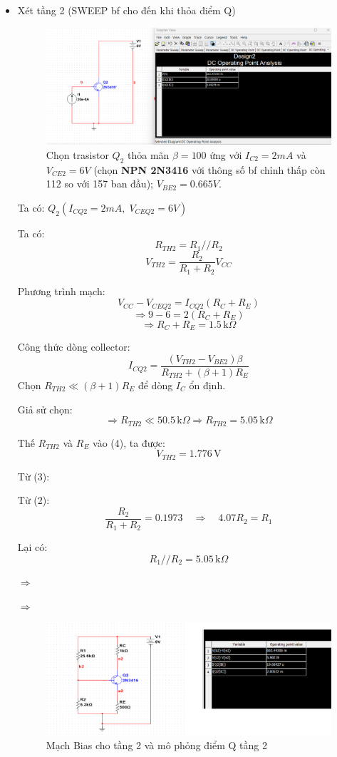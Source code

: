 \begin{itemize}[label=-]
\item Xét tầng 2 (SWEEP bf cho đến khi thỏa điểm Q)

\begin{figure}[H]
	\centering
	\includegraphics[width=.8\linewidth]{./my-chapters/my-images/Question10/a_tang3.png}
	\caption{Chọn trasistor $Q_{2}$ thỏa mãn $\beta = 100$ ứng với $I_{C2} = 2 mA$ và $V_{CE2} = 6V$ (chọn \textbf{NPN 2N3416} với thông số bf chỉnh thấp còn 112 so với 157 ban đầu); $V_{BE2} =0.665V$.}
\end{figure}

\noindent Ta có: $Q_2( I_{CQ2} = 2{mA},\; V_{CEQ2} = 6{V})$

Ta có:
\[
R_{TH2} = R_1 // R_2 \tag{1}
\]
\[
V_{TH2} = \frac{R_2}{R_1 + R_2} V_{CC} \tag{2}
\]

Phương trình mạch:
\[
V_{CC} - V_{CEQ2} = I_{CQ2}(R_C + R_E)
\]
\[
\Rightarrow 9 - 6 = 2(R_C + R_E)
\]
\[
\Rightarrow R_C + R_E = 1.5\,\text{k}\Omega \tag{3}
\]

Công thức dòng collector:
\[
I_{CQ2} = \frac{(V_{TH2} - V_{BE2})\beta}{R_{TH2} + (\beta + 1)R_E} \tag{4}
\]
Chọn \( R_{TH2} \ll (\beta + 1)R_E \) để dòng \( I_C \) ổn định.  

Giả sử chọn: 
\[
\Rightarrow R_{TH2} \ll 50.5\,\text{k}\Omega \Rightarrow R_{TH2} = 5.05\,\text{k}\Omega
\]

Thế \( R_{TH2} \) và \( R_E \) vào (4), ta được:
\[
V_{TH2} = 1.776\,\text{V}
\]

Từ (3):


Từ (2):
\[
\frac{R_2}{R_1 + R_2} = 0.1973 \quad \Rightarrow \quad 4.07R_2 = R_1
\]

Lại có:
\[
R_1 // R_2 = 5.05\,\text{k}\Omega
\]

$\Rightarrow$  

$\Rightarrow$ 

\begin{figure}[H]
	\centering
	\includegraphics[width=.8\linewidth]{./my-chapters/my-images/Question10/a_tang4.png}
	\caption{Mạch Bias cho tầng 2 và mô phỏng điểm Q tầng 2}
\end{figure}

\end{itemize}

